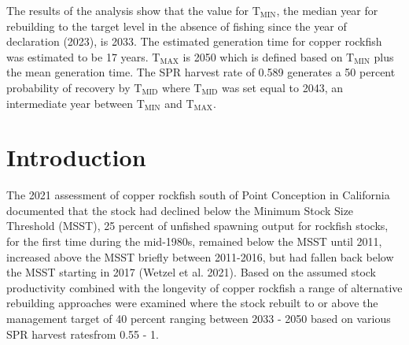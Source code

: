 \documentclass[11pt,
  english,
  a4paper,
]{article}
\begin{document}
\leavevmode\tagmcend\tagstructend\par


The results of the analysis show that the value for {\(\text{T}_\text{MIN}\)\leavevmode\tagmcend\tagstructend}, the median year for rebuilding to the target level in the absence of fishing since the year of declaration (2023), is 2033. The estimated generation time for copper rockfish was estimated to be 17 years. {\(\text{T}_\text{MAX}\)\leavevmode\tagmcend\tagstructend} is 2050 which is defined based on {\(\text{T}_\text{MIN}\)\leavevmode\tagmcend\tagstructend} plus the mean generation time. The SPR harvest rate of 0.589 generates a 50 percent probability of recovery by {\(\text{T}_\text{MID}\)\leavevmode\tagmcend\tagstructend} where {\(\text{T}_\text{MID}\)\leavevmode\tagmcend\tagstructend} was set equal to 2043, an intermediate year between {\(\text{T}_\text{MIN}\)\leavevmode\tagmcend\tagstructend} and {\(\text{T}_\text{MAX}\)\leavevmode\tagmcend\tagstructend}.

\leavevmode\tagmcend\tagstructend\par

\pagebreak
\setlength{\parskip}{5mm plus1mm minus1mm}
\setcounter{page}{1}
\renewcommand{\thefigure}{\arabic{figure}}
\renewcommand{\thetable}{\arabic{table}}
\setcounter{table}{0}
\setcounter{figure}{0}

\setlength\parskip{0.2em plus 0.1em minus 0.2em}


\hypertarget{introduction}{%
\section{Introduction}\label{introduction}}

\leavevmode\tagmcend\tagstructend


The 2021 assessment of copper rockfish south of Point Conception in California documented that the stock had declined below the Minimum Stock Size Threshold (MSST), 25 percent of unfished spawning output for rockfish stocks, for the first time during the mid-1980s, remained below the MSST until 2011, increased above the MSST briefly between 2011-2016, but had fallen back below the MSST starting in 2017 {(Wetzel et al. 2021)\leavevmode\tagmcend\tagstructend}. Based on the assumed stock productivity combined with the longevity of copper rockfish a range of alternative rebuilding approaches were examined where the stock rebuilt to or above the management target of 40 percent ranging between 2033 - 2050 based on various SPR harvest ratesfrom 0.55 - 1.
\end{document}
